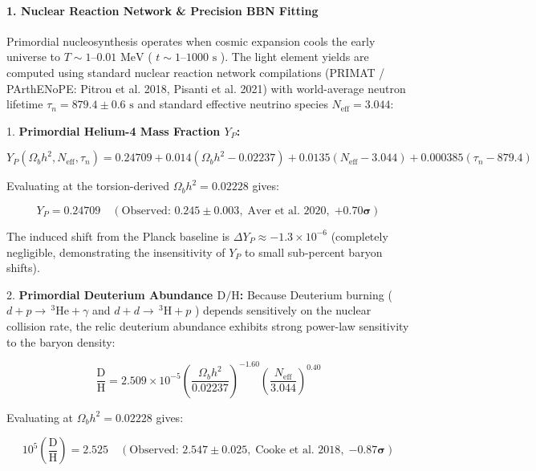 \documentclass[11pt,a4paper]{article}
\theoremstyle{definition}\newtheorem{definition}{Definition}
\theoremstyle{remark}\newtheorem{remark}{Remark}
\begin{document}
\paragraph{1. Nuclear Reaction Network \& Precision BBN Fitting}

Primordial nucleosynthesis operates when cosmic expansion cools the early universe to $T \sim 1\text{--}0.01\text{ MeV}$ ( $t \sim 1\text{--}1000\text{ s}$ ). The light element yields are computed using standard nuclear reaction network compilations (PRIMAT / PArthENoPE: Pitrou et al. 2018, Pisanti et al. 2021) with world-average neutron lifetime $\tau_n = 879.4 \pm 0.6\text{ s}$ and standard effective neutrino species $N_{\text{eff}} = 3.044$:

1. \textbf{Primordial Helium-4 Mass Fraction $Y_P$:}


\begin{equation}
Y_P(\Omega_b h^2, N_{\text{eff}}, \tau_n) = 0.24709 + 0.014(\Omega_b h^2 - 0.02237) + 0.0135(N_{\text{eff}} - 3.044) + 0.000385(\tau_n - 879.4)
\end{equation}


Evaluating at the torsion-derived $\Omega_b h^2 = 0.02228$ gives:


\begin{equation}
Y_P = 0.24709 \quad (\text{Observed: } 0.245 \pm 0.003, \; \text{Aver et al. 2020}, \; \mathbf{+0.70\sigma})
\end{equation}


The induced shift from the Planck baseline is $\Delta Y_P \approx -1.3 \times 10^{-6}$ (completely negligible, demonstrating the insensitivity of $Y_P$ to small sub-percent baryon shifts).

2. \textbf{Primordial Deuterium Abundance $\text{D/H}$:}
Because Deuterium burning ( $d + p \to \, ^3\text{He} + \gamma$ and $d + d \to \, ^3\text{H} + p$ ) depends sensitively on the nuclear collision rate, the relic deuterium abundance exhibits strong power-law sensitivity to the baryon density:


\begin{equation}
\frac{\text{D}}{\text{H}} = 2.509 \times 10^{-5} \left( \frac{\Omega_b h^2}{0.02237} \right)^{-1.60} \left( \frac{N_{\text{eff}}}{3.044} \right)^{0.40}
\end{equation}


Evaluating at $\Omega_b h^2 = 0.02228$ gives:


\begin{equation}
10^5 \left(\frac{\text{D}}{\text{H}}\right) = 2.525 \quad (\text{Observed: } 2.547 \pm 0.025, \; \text{Cooke et al. 2018}, \; \mathbf{-0.87\sigma})
\end{equation}
\end{document}
